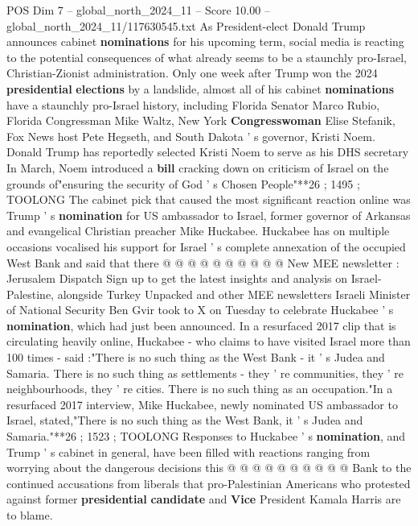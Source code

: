 \begin{textsample}{POS Dim 7 – global\_north\_2024\_11 – Score 10.00 – global\_north\_2024\_11/117630545.txt}  \label{ex:f7_pos_116}
As President-elect Donald Trump announces cabinet \textbf{nominations} for his upcoming term, social media is reacting to the potential consequences of what already seems to be a staunchly pro-Israel, Christian-Zionist administration.
Only one week after Trump won the 2024 \textbf{presidential} \textbf{elections} by a landslide, almost all of his cabinet \textbf{nominations} have a staunchly pro-Israel history, including Florida Senator Marco Rubio, Florida Congressman Mike Waltz, New York \textbf{Congresswoman} Elise Stefanik, Fox News host Pete Hegseth, and South Dakota ' s governor, Kristi Noem.
Donald Trump has reportedly selected Kristi Noem to serve as his DHS secretary In March, Noem introduced a \textbf{bill} cracking down on criticism of Israel on the grounds of"ensuring the security of God ' s Chosen People"**26 ; 1495 ; TOOLONG The cabinet pick that caused the most significant reaction online was Trump ' s \textbf{nomination} for US ambassador to Israel, former governor of Arkansas and evangelical Christian preacher Mike Huckabee.
Huckabee has on multiple occasions vocalised his support for Israel ' s complete annexation of the occupied West Bank and said that there @ @ @ @ @ @ @ @ @ @ New MEE newsletter : Jerusalem Dispatch Sign up to get the latest insights and analysis on Israel-Palestine, alongside Turkey Unpacked and other MEE newsletters Israeli Minister of National Security Ben Gvir took to X on Tuesday to celebrate Huckabee ' s \textbf{nomination}, which had just been announced.
In a resurfaced 2017 clip that is circulating heavily online, Huckabee - who claims to have visited Israel more than 100 times - said :"There is no such thing as the West Bank - it ' s Judea and Samaria.
There is no such thing as settlements - they ' re communities, they ' re neighbourhoods, they ' re cities.
There is no such thing as an occupation."In a resurfaced 2017 interview, Mike Huckabee, newly nominated US ambassador to Israel, stated,"There is no such thing as the West Bank, it ' s Judea and Samaria."**26 ; 1523 ; TOOLONG Responses to Huckabee ' s \textbf{nomination}, and Trump ' s cabinet in general, have been filled with reactions ranging from worrying about the dangerous decisions this @ @ @ @ @ @ @ @ @ @ Bank to the continued accusations from liberals that pro-Palestinian Americans who protested against former \textbf{presidential} \textbf{candidate} and \textbf{Vice} President Kamala Harris are to blame.

\end{textsample}
